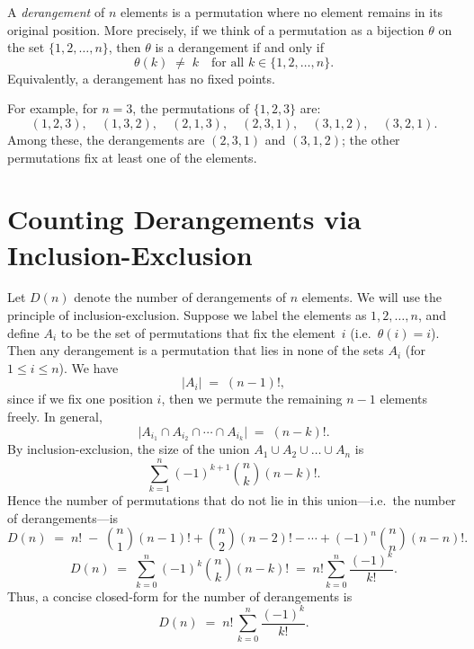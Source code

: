 \documentclass{article}
\begin{document}
A \emph{derangement} of $n$ elements is a permutation where no element remains in its original position. More precisely, if we think of a permutation as a bijection $\theta$ on the set $\{1,2,\ldots,n\}$, then $\theta$ is a derangement if and only if 
\[
\theta(k) \;\neq\; k \quad \text{for all } k \in \{1,2,\dots,n\}.
\]
Equivalently, a derangement has no fixed points.

For example, for $n=3$, the permutations of $\{1,2,3\}$ are:
\[
(1,2,3), \quad (1,3,2), \quad (2,1,3), \quad (2,3,1), \quad (3,1,2), \quad (3,2,1).
\]
Among these, the derangements are $(2,3,1)$ and $(3,1,2)$; the other permutations fix at least one of the elements.

\section*{Counting Derangements via Inclusion-Exclusion}

Let $D(n)$ denote the number of derangements of $n$ elements. We will use the principle of inclusion-exclusion. Suppose we label the elements as $1,2,\dots,n$, and define $A_i$ to be the set of permutations that fix the element~$i$ (i.e.\ $\theta(i)=i$). Then any derangement is a permutation that lies in none of the sets $A_i$ (for $1 \le i \le n$). We have
\[
\bigl|A_i\bigr| \;=\; (n-1)!,
\]
since if we fix one position $i$, then we permute the remaining $n-1$ elements freely. In general,
\[
\bigl|A_{i_1} \cap A_{i_2} \cap \cdots \cap A_{i_k}\bigr| \;=\; (n-k)!.
\]
By inclusion-exclusion, the size of the union $A_1 \cup A_2 \cup \dots \cup A_n$ is
\[
\sum_{k=1}^{n} (-1)^{k+1} \binom{n}{k} (n-k)!.
\]
Hence the number of permutations that do not lie in this union---i.e.\ the number of derangements---is
\[
D(n) \;=\; n! \;-\; \binom{n}{1}(n-1)! + \binom{n}{2}(n-2)! - \cdots + (-1)^n \binom{n}{n}(n-n)!.
\]
\[
D(n) \;=\; \sum_{k=0}^{n} (-1)^k \binom{n}{k} (n-k)!
\;=\; n! \sum_{k=0}^{n} \frac{(-1)^k}{k!}.
\]
Thus, a concise closed-form for the number of derangements is
\[
D(n) \;=\; n!\,\sum_{k=0}^{n} \frac{(-1)^k}{k!}.
\]

\begin{center}
\end{center}
\end{document}
